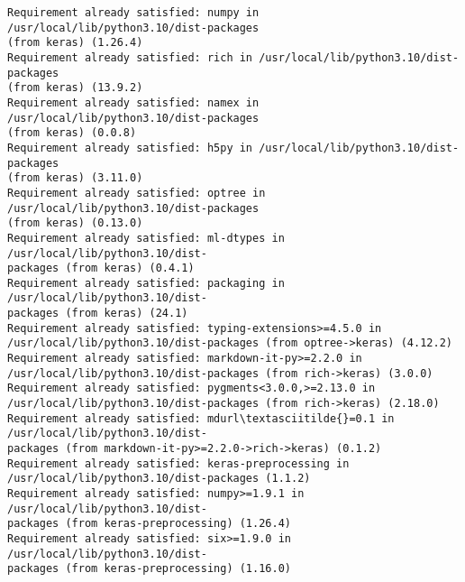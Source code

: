 \documentclass[11pt]{article}
\begin{document}
\begin{Verbatim}[commandchars=\\\{\}]
Requirement already satisfied: numpy in /usr/local/lib/python3.10/dist-packages
(from keras) (1.26.4)
Requirement already satisfied: rich in /usr/local/lib/python3.10/dist-packages
(from keras) (13.9.2)
Requirement already satisfied: namex in /usr/local/lib/python3.10/dist-packages
(from keras) (0.0.8)
Requirement already satisfied: h5py in /usr/local/lib/python3.10/dist-packages
(from keras) (3.11.0)
Requirement already satisfied: optree in /usr/local/lib/python3.10/dist-packages
(from keras) (0.13.0)
Requirement already satisfied: ml-dtypes in /usr/local/lib/python3.10/dist-
packages (from keras) (0.4.1)
Requirement already satisfied: packaging in /usr/local/lib/python3.10/dist-
packages (from keras) (24.1)
Requirement already satisfied: typing-extensions>=4.5.0 in
/usr/local/lib/python3.10/dist-packages (from optree->keras) (4.12.2)
Requirement already satisfied: markdown-it-py>=2.2.0 in
/usr/local/lib/python3.10/dist-packages (from rich->keras) (3.0.0)
Requirement already satisfied: pygments<3.0.0,>=2.13.0 in
/usr/local/lib/python3.10/dist-packages (from rich->keras) (2.18.0)
Requirement already satisfied: mdurl\textasciitilde{}=0.1 in /usr/local/lib/python3.10/dist-
packages (from markdown-it-py>=2.2.0->rich->keras) (0.1.2)
Requirement already satisfied: keras-preprocessing in
/usr/local/lib/python3.10/dist-packages (1.1.2)
Requirement already satisfied: numpy>=1.9.1 in /usr/local/lib/python3.10/dist-
packages (from keras-preprocessing) (1.26.4)
Requirement already satisfied: six>=1.9.0 in /usr/local/lib/python3.10/dist-
packages (from keras-preprocessing) (1.16.0)
    \end{Verbatim}
\end{document}
